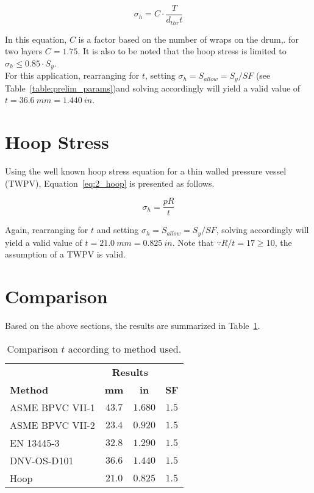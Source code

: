 \begin{equation}
	\label{eq:2_DNV_hoop}
	\sigma_h = C\cdot\frac{T}{d_{thr}t}
\end{equation}

In this equation, $C$ is a factor based on the number of wraps on the drum,. for two layers $C=1.75$. It is also to be noted that the hoop stress is limited to $\sigma_h \leq 0.85\cdot S_y$. \\

For this application, rearranging for $t$, setting $\sigma_h = S_{allow}=S_y/SF$ (see Table~\ref{table:prelim_params})and solving accordingly will yield a valid value of $t = 36.6\ mm = 1.440 \ in$. 

\section{Hoop Stress}

Using the well known hoop stress equation \citep{roarks} for a thin walled pressure vessel (TWPV), Equation~\ref{eq:2_hoop} is presented as follows.

\begin{equation}
	\label{eq:2_hoop}
	\sigma_h = \frac{pR}{t}
\end{equation}

Again, rearranging for $t$ and setting $\sigma_h = S_{allow}=S_y/SF$, solving accordingly will yield a valid value of $t = 21.0\ mm = 0.825 \ in$. Note that $\because R/t = 17 \geq 10$, the assumption of a TWPV is valid.

\pagebreak

\section{Comparison}

Based on the above sections, the results are summarized in Table~\ref{table:2_comp}.
\begin{table}[htbp]
  \centering
  \caption{Comparison $t$ according to method used.}
    \begin{tabular}{lccc}
          & \multicolumn{2}{c}{\textbf{Results}} &  \\
    \textbf{Method} & \textbf{mm} & \textbf{in} & \textbf{SF} \\
    \midrule
    ASME BPVC VII-1 & $43.7$  & $1.680$ & $1.5$ \\
    ASME BPVC VII-2 & $23.4$  & $0.920$ & $1.5$ \\
    EN 13445-3 & $32.8$  & $1.290$ & $1.5$ \\    
    DNV-OS-D101 & $36.6$  & $1.440$ & $1.5$ \\
    Hoop	& $21.0$ &$0.825$ & $1.5$\\
    \end{tabular}%
  \label{table:2_comp}%
\end{table}%

